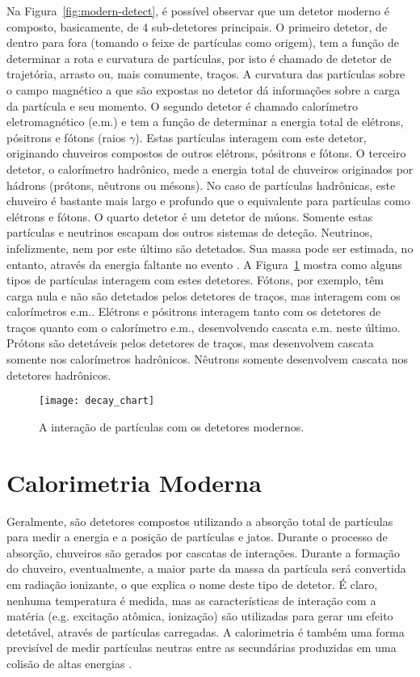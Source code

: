 Na Figura~\ref{fig:modern-detect}, é possível observar que um detetor moderno
é composto, basicamente, de 4 sub-detetores principais. O primeiro detetor, de
dentro para fora (tomando o feixe de partículas como origem), tem a função de
determinar a rota e curvatura de partículas, por isto é chamado de detetor de
trajetória, arrasto ou, mais comumente, traços. A curvatura das partículas
sobre o campo magnético a que são expostas no detetor dá informações sobre a
carga da partícula e seu momento. O segundo detetor é chamado calorímetro
eletromagnético (e.m.) e tem a função de determinar a energia total de
elétrons, pósitrons e fótons (raios $\gamma$). Estas partículas interagem com
este detetor, originando chuveiros compostos de outros elétrons, pósitrons e
fótons. O terceiro detetor, o calorímetro hadrônico, mede a energia total de
chuveiros originados por hádrons (prótons, nêutrons ou mésons). No caso de
partículas hadrônicas, este chuveiro é bastante mais largo e profundo que o
equivalente para partículas como elétrons e fótons. O quarto detetor é um
detetor de múons. Somente estas partículas e neutrinos escapam dos outros
sistemas de deteção. Neutrinos, infelizmente, nem por este último são
detetados. Sua massa pode ser estimada, no entanto, através da energia
faltante no evento \cite{atlas-tp}. A Figura~\ref{fig:decay} mostra como
alguns tipos de partículas interagem com estes detetores. Fótons, por exemplo,
têm carga nula e não são detetados pelos detetores de traços, mas interagem
com os calorímetros e.m.. Elétrons e pósitrons interagem tanto com os
detetores de traços quanto com o calorímetro e.m., desenvolvendo cascata
e.m. neste último. Prótons são detetáveis pelos detetores de traços, mas
desenvolvem cascata somente nos calorímetros hadrônicos. Nêutrons somente
desenvolvem cascata nos detetores hadrônicos.

\begin{figure}
\begin{center}
\texttt{[image: decay\_chart]}
\end{center}
\caption{A interação de partículas com os detetores modernos.}
\label{fig:decay}
\end{figure}

\section{Calorimetria Moderna}
\label{sec:calorimetria}

Geralmente,  são detetores compostos utilizando a absorção
total de partículas para medir a energia e a posição de partículas e
jatos. Durante o processo de absorção, chuveiros são gerados por cascatas de
interações. Durante a formação do chuveiro, eventualmente, a maior parte da
massa da partícula será convertida em radiação ionizante, o que explica o nome
deste tipo de detetor. É claro, nenhuma temperatura é medida, mas as
características de interação com a matéria (e.g. excitação atômica, ionização)
são utilizadas para gerar um efeito detetável, através de partículas
carregadas. A calorimetria é também uma forma previsível de medir partículas
neutras entre as secundárias produzidas em uma colisão de altas energias
\cite{bock:detector, booth}.

